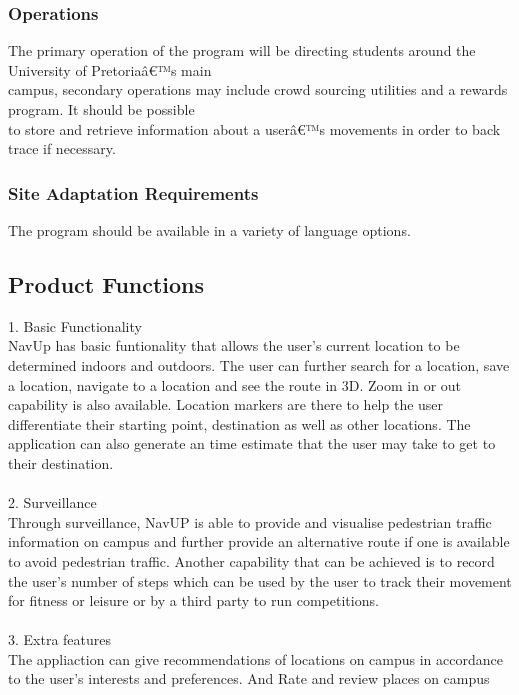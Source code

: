 \documentclass[a4paper,10pt]{article}
\begin{document}
		\subsubsection{Operations}
			The primary operation of the program will be directing students around the University of Pretoriaâ€™s main\\				campus, secondary operations may include crowd sourcing utilities and a rewards program. It should be possible\\			to store and retrieve information about a userâ€™s movements in order to back trace if necessary.\\
		\subsubsection{Site Adaptation Requirements}
			The program should be available in a variety of language options.\\
		
	\subsection{Product Functions}
		1. Basic Functionality\\
			NavUp has basic funtionality that allows the user's current location to be determined indoors and outdoors. The user can further search for a location, save a location, navigate to a location and see the route in 3D. Zoom in or out capability is also available. Location markers  are there to help the user differentiate their starting point, destination as well as other locations. The application can also generate an time estimate that the user may take to get to their destination.\\
		\\
		2. Surveillance\\
			Through surveillance, NavUP is able to provide and visualise pedestrian traffic information on campus and further provide an alternative route if one is available to avoid pedestrian traffic. Another capability that can be achieved is to record the user's number of steps which can be used by the user to track their movement for fitness or leisure or by a third party to run competitions.\\
		\\
		3. Extra features\\
			The appliaction can give recommendations of locations on campus in accordance to the user’s interests and preferences. And Rate and review places on campus\\
			
\end{document}
